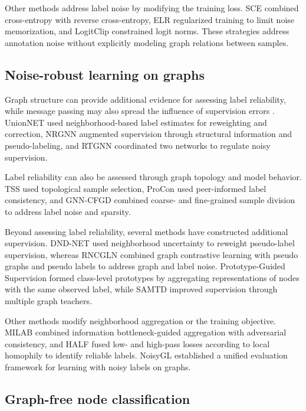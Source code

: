 \documentclass[10pt,letterpaper,nopreprintline]{elsarticle}
\theoremstyle{plain}
\begin{document}
Other methods address label noise by modifying the training loss. SCE \cite{ref23} combined cross-entropy with reverse cross-entropy, ELR \cite{ref24} regularized training to limit noise memorization, and LogitClip \cite{ref26} constrained logit norms. These strategies address annotation noise without explicitly modeling graph relations between samples.

\subsection{Noise-robust learning on graphs}\label{sec:2.2}

Graph structure can provide additional evidence for assessing label reliability, while message passing may also spread the influence of supervision errors \cite{ref6}. UnionNET \cite{ref27} used neighborhood-based label estimates for reweighting and correction, NRGNN \cite{ref7} augmented supervision through structural information and pseudo-labeling, and RTGNN \cite{ref8} coordinated two networks to regulate noisy supervision.

Label reliability can also be assessed through graph topology and model behavior. TSS \cite{ref9} used topological sample selection, ProCon \cite{ref29} used peer-informed label consistency, and GNN-CFGD \cite{ref31} combined coarse- and fine-grained sample division to address label noise and sparsity.

Beyond assessing label reliability, several methods have constructed additional supervision. DND-NET \cite{ref32} used neighborhood uncertainty to reweight pseudo-label supervision, whereas RNCGLN \cite{ref33} combined graph contrastive learning with pseudo graphs and pseudo labels to address graph and label noise. Prototype-Guided Supervision \cite{ref34} formed class-level prototypes by aggregating representations of nodes with the same observed label, while SAMTD \cite{ref36} improved supervision through multiple graph teachers.

Other methods modify neighborhood aggregation or the training objective. MILAB \cite{ref38} combined information bottleneck-guided aggregation with adversarial consistency, and HALF \cite{ref39} fused low- and high-pass losses according to local homophily to identify reliable labels. NoisyGL \cite{ref6} established a unified evaluation framework for learning with noisy labels on graphs.

\subsection{Graph-free node classification}\label{sec:2.3}
\end{document}
